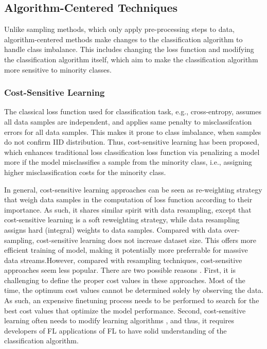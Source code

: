 \documentclass[10pt,journal,compsoc]{IEEEtran}
\begin{document}
\subsection{Algorithm-Centered Techniques}
Unlike sampling methods, which only apply pre-processing steps to data, algorithm-centered methods make changes to the classification algorithm to handle class imbalance. This includes changing the loss function and modifying the classification algorithm itself, which aim to make the classification algorithm more sensitive to minority classes.
\vspace{-0.2cm}

\subsubsection{Cost-Sensitive Learning}
The classical loss function used for classification task, e.g., cross-entropy, assumes all data samples are independent, and applies same penalty to misclassifcation errors for all data samples. This makes it prone to class imbalance, when samples do not confirm IID distribution. Thus, cost-sensitive learning has been proposed, which enhances traditional loss classification loss function via penalizing a model more if the model misclassifies a sample from the minority class, i.e., assigning higher misclassification costs for the minority class. 

In general, cost-sensitive learning approaches can be seen as re-weighting strategy that weigh data samples in the computation of loss function according to their importance. As such, it shares similar spirit with data resampling, except that cost-sensitive learning is a soft reweighting strategy, while data resampling assigns hard (integral) weights to data samples. Compared with data over-sampling, cost-sensitive learning does not increase dataset size. This offers more efficient training of model, making it potentially more preferrable for massive data streams.However, compared with resampling techniques, cost-sensitive approaches seem less popular. There are two possible reasons \cite{krawczyk2014cost}. First, it is challenging to define the proper cost values in these approaches. Most of the time, the optimum cost values cannot be determined solely by observing the data. As such, an expensive finetuning process needs to be performed to search for the best cost values that optimize the model performance. Second, cost-sensitive learning often needs to modify learning algorithms \cite{haixiang2017learning}, and thus, it requires developers of FL applications of FL to have solid understanding of the classification algorithm.
\end{document}
